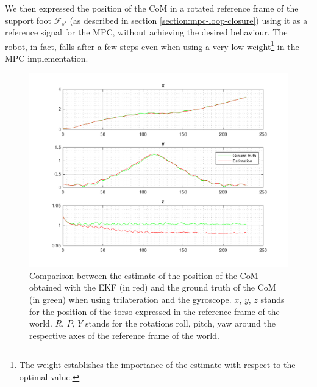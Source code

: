 \documentclass[a4paper]{article}
\begin{document}
We then expressed the position of the CoM
in a rotated reference frame of the support foot $\mathcal{F}_{s'}$
(as described in section \ref{section:mpc-loop-closure}) using it as a reference
signal for the MPC, without achieving the
desired behaviour. The robot, in fact, falls after a few steps even when using
a very low weight\footnote{The weight establishes the importance of the
estimate with respect to the optimal value.} in the MPC implementation. %
\begin{figure}
    \centering
    \includegraphics[width=\textwidth]{images/trilateration_com}
    \caption{Comparison between the estimate of the position of the CoM
        obtained with the EKF (in red) and the ground truth of the CoM
        (in green) when using trilateration and the gyroscope.
        $x$, $y$, $z$ stands for the position
        of the torso expressed in the reference frame of the
        world. $R$, $P$, $Y$ stands for the rotations roll,
        pitch, yaw around the respective axes of the
        reference frame of the world.}
    \label{fig:comp_estimated_torso_com}
\end{figure}
\end{document}
